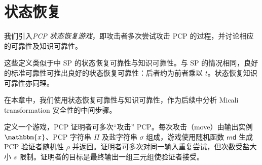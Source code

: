 \documentclass[american,singlepageview]{snargs-book-zh}
\newcommand{\Instance}{\mathbbm{x}}
\newcommand{\PCPString}{\Pi}
\newcommand{\PCPVerifierRandomMessage}{\rho}
\newcommand{\ROQueryBound}{t}
\newcommand{\SRSaltSize}{s}
\newcommand{\SRSaltString}{\sigma}
\newcommand{\SRRandomness}{\mathsf{rnd}}
\begin{document}
\section{状态恢复}
\label{section:pcp-state-restoration}

我们引入\emph{PCP 状态恢复游戏}，即攻击者多次尝试攻击 PCP 的过程，并讨论相应的可靠性及知识可靠性。

这些定义类似于中 SP 的状态恢复可靠性与知识可靠性。与 SP 的情况相同，良好的标准可靠性可推出良好的状态恢复可靠性：后者约为前者乘以 $\ROQueryBound$。状态恢复知识可靠性亦同理。

在本章中，我们使用状态恢复可靠性与知识可靠性，作为后续中分析 Micali transformation 安全性的中间步骤。

定义一个游戏，PCP 证明者可多次“攻击” PCP。每次攻击（move）由输出实例 $\Instance$、PCP 字符串 $\PCPString$ 及盐字符串 $\SRSaltString$ 组成，游戏使用随机函数 $\SRRandomness$ 生成 PCP 验证者随机性 $\PCPVerifierRandomMessage$ 并返回。证明者可多次对同一输入重复尝试，但次数受盐大小 $\SRSaltSize$ 限制。证明者的目标是最终输出一组三元组使验证者接受。
\end{document}
